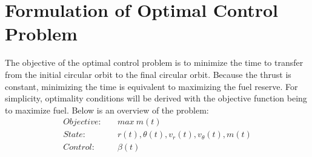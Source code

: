 \documentclass[]{article}
\begin{document}
\section{Formulation of Optimal Control Problem}
The objective of the optimal control problem is to minimize the time to transfer from the initial circular orbit to the final circular orbit. Because the thrust is constant, minimizing the time is equivalent to maximizing the fuel reserve. For simplicity, optimality conditions will be derived with the objective function being to maximize fuel. Below is an overview of the problem:
\begin{align*}
	Objective:& \quad max\ m(t) \\
	State:&     \quad r(t), \theta(t), v_r(t), v_\theta(t), m(t) \\
	Control:&   \quad \beta(t)
\end{align*}
\end{document}
